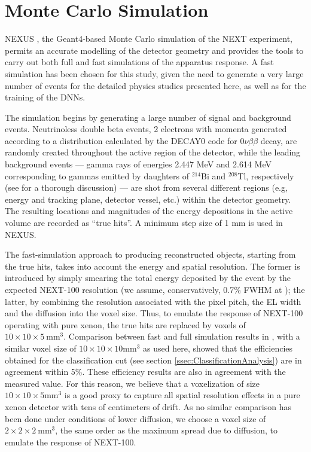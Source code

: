 \documentclass[a4paper,11pt]{article}
\begin{document}
\section{Monte Carlo Simulation}\label{sec.MC}
NEXUS \cite{MartinAlbo_thesis}, the  Geant4-based \cite{GEANT4} Monte Carlo simulation of the NEXT experiment, permits an accurate modelling of the detector geometry and provides the tools to carry out both full and fast simulations of the apparatus response. A fast simulation has been chosen for this study, given the need to generate a very large number of events for the detailed physics studies presented here, as well as for the training of the DNNs.

The simulation begins by generating a large number of signal and background events. Neutrinoless double beta events, 2 electrons with momenta generated according to a distribution calculated by the DECAY0 code \cite{Ponkratenko_2000} for $0\nu\beta\beta$ decay, are randomly created throughout the active region of the detector, while the leading background events --- gamma rays of energies 2.447 MeV and 2.614 MeV corresponding to gammas emitted by daughters of $^{214}$Bi and $^{208}$Tl, respectively (see \cite{Martin-Albo:2015rhw} for a thorough discussion) --- are shot from several different regions (e.g, energy and tracking plane, detector vessel, etc.) within the detector geometry.  The resulting locations and magnitudes of the energy depositions in the active volume are recorded as ``true hits''.  A minimum step size of 1 mm is used in NEXUS.

The fast-simulation approach to producing reconstructed objects, starting from the true hits, takes into account the energy and spatial resolution. The former is introduced by simply smearing the total energy deposited by the event by the expected NEXT-100 resolution (we assume, conservatively, 0.7\% FWHM at \Qbb); the latter, by combining the resolution associated with the pixel pitch, the EL width and the diffusion into the voxel size. Thus, to emulate the response of NEXT-100 operating with pure xenon, the true hits are replaced by voxels of $10 \times 10 \times 5 \mathrm{~mm^3}$. Comparison between fast and full simulation results in \cite{NEXT_topology}, with a similar voxel size of $10 \times 10 \times 10 \mathrm{mm^3}$ as used here, showed that the efficiencies obtained for the classification cut (see section \ref{ssec:ClassificationAnalysis}) are in agreement within 5\%. These efficiency results are also in agreement with the measured value. For this reason, we believe that a voxelization of size $10 \times 10 \times 5 \mathrm{mm^3}$ is a good proxy to capture all spatial resolution effects in a pure xenon detector with tens of centimeters of drift. As no similar comparison has been done under conditions of lower diffusion, we choose a voxel size of $2 \times 2 \times 2 \mathrm{~mm^3}$, the same order as the maximum spread due to diffusion, to emulate the response of NEXT-100.
\end{document}
